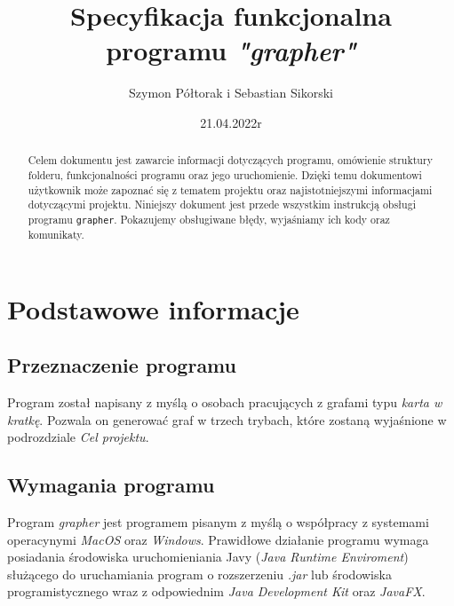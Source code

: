 \documentclass[10pt, a4paper]{report}
\title{\huge{\textbf{Specyfikacja funkcjonalna} \\ programu \textit{"grapher"}}}
\author{Szymon Półtorak i Sebastian Sikorski}
\date{21.04.2022r}
\begin{document}
    \maketitle
    \renewcommand*\thesection{\arabic{section}}

    \begin{abstract}
      Celem dokumentu jest zawarcie informacji dotyczących programu, omówienie struktury folderu, funkcjonalności programu oraz jego uruchomienie.
      Dzięki temu dokumentowi użytkownik może zapoznać się z tematem projektu oraz najistotniejszymi informacjami dotyczącymi projektu. Niniejszy dokument jest przede wszystkim instrukcją obsługi
      programu \texttt{grapher}. Pokazujemy obsługiwane błędy, wyjaśniamy ich kody oraz komunikaty.
    \end{abstract}

    \pagestyle{fancy}
    \fancyhf{}
    
    \tableofcontents
    \newpage

    \section{Podstawowe informacje}
    \subsection{Przeznaczenie programu}
    Program został napisany z myślą o osobach pracujących z grafami typu \textit{karta w kratkę}. Pozwala on generować graf w trzech trybach, które
    zostaną wyjaśnione w podrozdziale \textit{Cel projektu}.

    \subsection{Wymagania programu}
    Program \textit{grapher} jest programem pisanym z myślą o współpracy z systemami operacynymi \textit{MacOS} oraz \textit{Windows}.
    Prawidłowe działanie programu wymaga posiadania środowiska uruchomieniania Javy (\textit{Java Runtime Enviroment}) służącego do uruchamiania program o rozszerzeniu \textit{.jar} lub środowiska
    programistycznego wraz z odpowiednim \textit{Java Development Kit} oraz \textit{JavaFX}.
\end{document}
